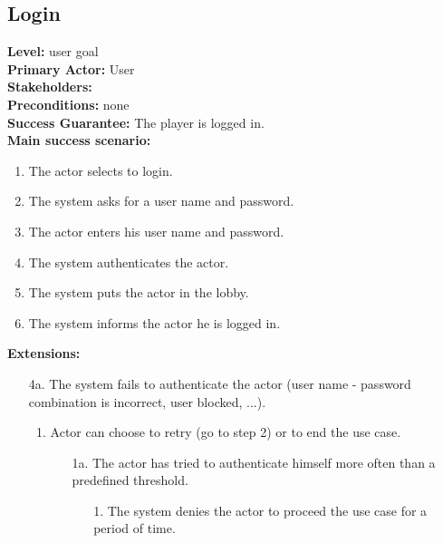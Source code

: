 \documentclass[a4paper,11pt]{report}
\begin{document}
\subsection{Login}
\textbf{Level:} user goal \\
\textbf{Primary Actor:} User \\
\textbf{Stakeholders:} \\
\textbf{Preconditions:} none \\
\textbf{Success Guarantee:} The player is logged in.\\
\textbf{Main success scenario:} 
\begin{enumerate}
\item The actor selects to login. 
\item The system asks for a user name and password. 
\item The actor enters his user name and password.
\item The system authenticates the actor. 
\item The system puts the actor in the lobby. 
\item The system informs the actor he is logged in. 
\end{enumerate}
\textbf{Extensions:}
\begin{itemize}
\item[4a.] The system fails to authenticate the actor (user name - password combination is incorrect, user blocked, ...). 
\begin{enumerate}
\item Actor can choose to retry (go to step 2) or to end the use case. 
\begin{enumerate}
\item[1a.] The actor has tried to authenticate himself more often than a predefined threshold.
\begin{enumerate}
\item[1.] The system denies the actor to proceed the use case for a period of time.
\end{enumerate}
\end{enumerate}
\end{enumerate}
\end{itemize}
\end{document}
